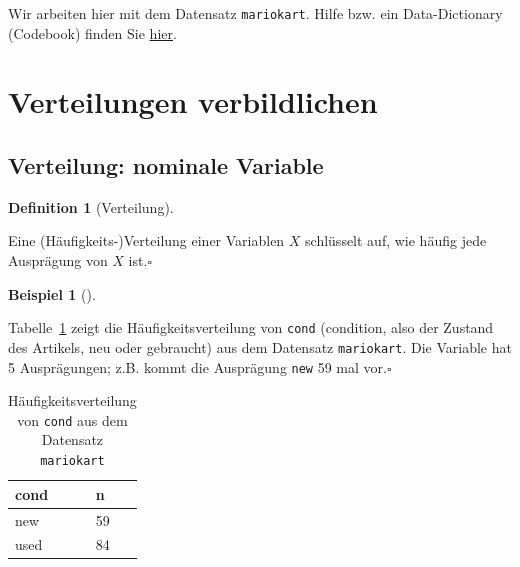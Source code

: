 \documentclass[
  letterpaper,
]{scrbook}
\theoremstyle{definition}
\newtheorem{example}{Beispiel}[chapter]
\theoremstyle{definition}
\newtheorem{definition}{Definition}[chapter]
\theoremstyle{definition}
\theoremstyle{remark}
\begin{document}
\begin{tcolorbox}[enhanced jigsaw, left=2mm, toptitle=1mm, toprule=.15mm, rightrule=.15mm, leftrule=.75mm, breakable, colbacktitle=quarto-callout-note-color!10!white, colback=white, coltitle=black, bottomtitle=1mm, opacityback=0, title=\textcolor{quarto-callout-note-color}{\faInfo}\hspace{0.5em}{Hinweis}, colframe=quarto-callout-note-color-frame, arc=.35mm, opacitybacktitle=0.6, bottomrule=.15mm, titlerule=0mm]

Wir arbeiten hier mit dem Datensatz \texttt{mariokart}. Hilfe bzw. ein
Data-Dictionary (Codebook) finden Sie
\href{https://www.rdocumentation.org/packages/openintro/versions/2.4.0/topics/mariokart}{hier}.

\end{tcolorbox}

\section{Verteilungen verbildlichen}\label{verteilungen-verbildlichen}

\subsection{Verteilung: nominale
Variable}\label{verteilung-nominale-variable}

\begin{definition}[Verteilung]\protect\hypertarget{def-verteilung}{}\label{def-verteilung}

Eine (Häufigkeits-)Verteilung einer Variablen \(X\) schlüsselt auf, wie
häufig jede Ausprägung von \(X\) ist.\(\square\)

\end{definition}

\begin{example}[]\protect\hypertarget{exm-verteilung1}{}\label{exm-verteilung1}

Tabelle~\ref{tbl-wheels-n} zeigt die Häufigkeitsverteilung von
\texttt{cond} (condition, also der Zustand des Artikels, neu oder
gebraucht) aus dem Datensatz \texttt{mariokart}. Die Variable hat 5
Ausprägungen; z.B. kommt die Ausprägung \texttt{new} 59 mal
vor.\(\square\)

\end{example}

\begin{longtable}[]{@{}ll@{}}

\caption{\label{tbl-wheels-n}Häufigkeitsverteilung von \texttt{cond} aus
dem Datensatz \texttt{mariokart}}

\tabularnewline

\toprule\noalign{}
cond & n \\
\midrule\noalign{}
\endhead
\bottomrule\noalign{}
\endlastfoot
new & 59 \\
used & 84 \\

\end{longtable}
\end{document}
